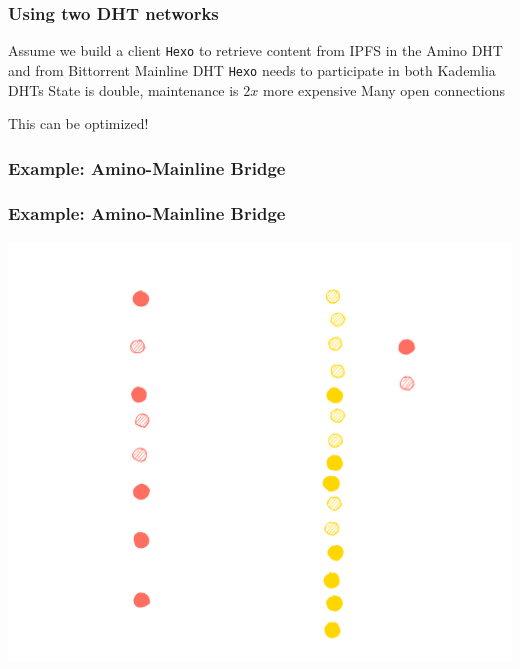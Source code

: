\documentclass{../shipyard-slide}
\begin{document}
\begin{frame}
\frametitle{Using two DHT networks}

\begin{itemize}
	\itemc Assume we build a client \texttt{Hexo} to retrieve content from IPFS in the Amino DHT and from Bittorrent Mainline DHT \smiley
	\itemc \texttt{Hexo} needs to participate in both Kademlia DHTs
	\itemc State is double, maintenance is $2x$ more expensive \frownie
	\itemc Many open connections \frownie
\end{itemize}

\vspace{1cm}

{\Large This can be optimized!}

\end{frame}

\begin{frame}
\frametitle{Example: Amino-Mainline Bridge}
\end{frame}


\begin{frame}
\frametitle{Example: Amino-Mainline Bridge}

\hspace{2cm}\includegraphics[scale=.13]{resources/rt1-0.png}
\end{frame}
\end{document}
